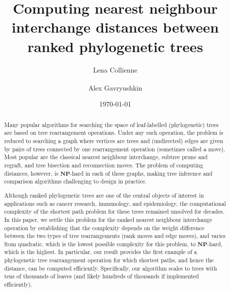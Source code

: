 \documentclass[11pt]{amsart}
\title[Computing $\rnni$ distance]{Computing nearest neighbour interchange distances between ranked phylogenetic trees}
\date{\today}
\author{Lena Collienne}
\author{Alex Gavryushkin\textsuperscript{\Letter}}
\newcommand{\np}{\mathbf{NP}}
\begin{document}
\begin{abstract}
Many popular algorithms for searching the space of leaf-labelled (phylogenetic) trees are based on tree rearrangement operations.
Under any such operation, the problem is reduced to searching a graph where vertices are trees and (undirected) edges are given by pairs of trees connected by one rearrangement operation (sometimes called a move).
Most popular are the classical nearest neighbour interchange, subtree prune and regraft, and tree bisection and reconnection moves.
The problem of computing distances, however, is $\np$-hard in each of these graphs, making tree inference and comparison algorithms challenging to design in practice.

Although ranked phylogenetic trees are one of the central objects of interest in applications such as cancer research, immunology, and epidemiology, the computational complexity of the shortest path problem for these trees remained unsolved for decades.
In this paper, we settle this problem for the ranked nearest neighbour interchange operation by establishing that the complexity depends on the weight difference between the two types of tree rearrangements (rank moves and edge moves), and varies from quadratic, which is the lowest possible complexity for this problem, to $\np$-hard, which is the highest.
In particular, our result provides the first example of a phylogenetic tree rearrangement operation for which shortest paths, and hence the distance, can be computed efficiently.
Specifically, our algorithm scales to trees with tens of thousands of leaves (and likely hundreds of thousands if implemented efficiently).
\end{abstract}


\maketitle
\end{document}
